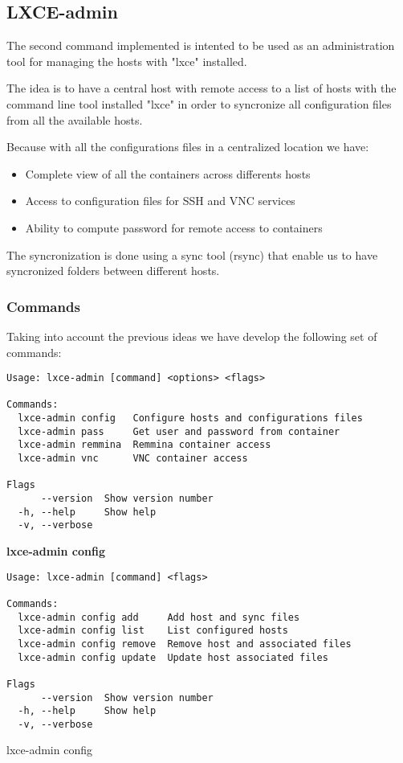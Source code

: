 \newpage
\subsection{LXCE-admin}
The second command implemented is intented to be used as an administration tool for managing the hosts with "lxce" installed.  

The idea is to have a central host with remote access to a list of hosts with the command line tool installed "lxce" in order to syncronize all configuration files from all the available hosts. 

Because with all the configurations files in a centralized location we have:
\begin{itemize}
	\item{Complete view of all the containers across differents hosts}
	\item{Access to configuration files for SSH and VNC services}
	\item{Ability to compute password for remote access to containers}
\end{itemize}

The syncronization is done using a sync tool (rsync) that enable us to have syncronized folders between different hosts.


\subsubsection{Commands}
Taking into account the previous ideas we have develop the following set of commands:

\begin{verbatim}
Usage: lxce-admin [command] <options> <flags>

Commands:
  lxce-admin config   Configure hosts and configurations files
  lxce-admin pass     Get user and password from container
  lxce-admin remmina  Remmina container access
  lxce-admin vnc      VNC container access

Flags
      --version  Show version number                                  
  -h, --help     Show help                                            
  -v, --verbose
\end{verbatim}

\newpage
\textbf{lxce-admin config}
\begin{listing}[H]
\begin{verbatim}
Usage: lxce-admin [command] <flags>

Commands:
  lxce-admin config add     Add host and sync files
  lxce-admin config list    List configured hosts
  lxce-admin config remove  Remove host and associated files
  lxce-admin config update  Update host associated files

Flags
      --version  Show version number                                   
  -h, --help     Show help                                             
  -v, --verbose
\end{verbatim}
\caption{lxce-admin config}
\label{listings: lxce-admin config}
\end{listing}

